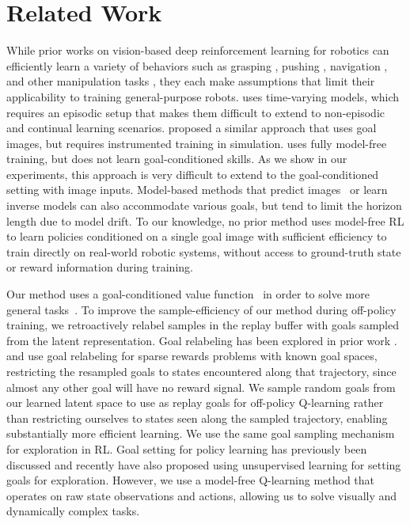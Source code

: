 \section{Related Work}
While prior works on vision-based deep reinforcement learning for robotics can efficiently learn a variety of behaviors such as grasping \citep{pinto2017asymmetric,pinto2015supersizing,levine2017grasping}, pushing \citep{agrawal2016poking,ebert2017videoprediction,finn2016visualforesight}, navigation \citep{pathak2018zeroshot, lange2012autonomous}, and other manipulation tasks \citep{lillicrap2015continuous, levine2016gps, pathak2018zeroshot}, they each make assumptions that limit their applicability to training general-purpose robots.
\citet{levine2016gps} uses time-varying models, which requires an episodic setup that makes them difficult to extend to non-episodic and continual learning scenarios.
\citet{pinto2017asymmetric} proposed a similar approach that uses goal images, but requires instrumented training in simulation. \citet{lillicrap2015continuous} uses fully model-free training, but does not learn goal-conditioned skills. As we show in our experiments, this approach is very difficult to extend to the goal-conditioned setting with image inputs.
Model-based methods that predict images~\citep{watter2015embed,finn2016visualforesight,ebert2017videoprediction,oh2015action} or learn inverse models \citep{agrawal2016poking} can also accommodate various goals, but tend to limit the horizon length due to model drift.
To our knowledge, no prior method uses model-free RL to learn policies conditioned on a single goal image with sufficient efficiency to train directly on real-world robotic systems, without access to ground-truth state or reward information during training.

Our method uses a goal-conditioned value function~\citep{schaul2015uva} in order to solve more general tasks~\citep{sutton2011horde, kaelbling1993goals}. To improve the sample-efficiency of our method during off-policy training, we retroactively relabel samples in the replay buffer with goals sampled from the latent representation.
Goal relabeling has been explored in prior work \citep{kaelbling1993goals,andrychowicz2017her,rauber2017hindsight,levy2017hierarchical,pong2018tdm}. \citet{andrychowicz2017her} and \citet{levy2017hierarchical} use goal relabeling for sparse rewards problems with known goal spaces, restricting the resampled goals to states encountered along that trajectory, since almost any other goal will have no reward signal.
We sample random goals from our learned latent space to use as replay goals for off-policy Q-learning rather than restricting ourselves to states seen along the sampled trajectory, enabling substantially more efficient learning. We use the same goal sampling mechanism for exploration in RL. Goal setting for policy learning has previously been discussed \citep{baranes2012activeimgep} and recently \citet{pere2018unsupervisedgoalspaces} have also proposed using unsupervised learning for setting goals for exploration.
However, we use a model-free Q-learning method that operates on raw state observations and actions, allowing us to solve visually and dynamically complex tasks.

